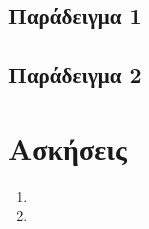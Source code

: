 \subsection{Παράδειγμα 1}

\subsection{Παράδειγμα 2}


\section{Ασκήσεις}
\begin{enumerate}
\item 
\item 
\end{enumerate}

\begin{thebibliography}{9}
\end{thebibliography}

